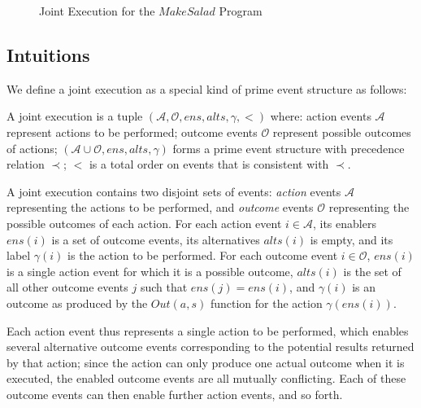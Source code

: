 %
\begin{figure}[!h]

\caption{Joint Execution for the $MakeSalad$ Program}


\label{fig:JE:MakeSalad1} 
\end{figure}



\subsection{Intuitions}

We define a joint execution as a special kind of prime event structure
as follows:

\begin{defnL}
 A joint execution is a tuple $(\mathcal{A},\mathcal{O},ens,alts,\gamma,<)$
where: action events $\mathcal{A}$ represent actions to be performed;
outcome events $\mathcal{O}$ represent possible outcomes of actions;
$(\mathcal{A}\cup\mathcal{O},ens,alts,\gamma)$ forms a prime event
structure with precedence relation $\prec$; $<$ is a total order
on events that is consistent with $\prec$. 
\end{defnL}
A joint execution contains two disjoint sets of events: \emph{action}
events $\mathcal{A}$ representing the actions to be performed, and
\emph{outcome} events $\mathcal{O}$ representing the possible outcomes
of each action. For each action event $i\in\mathcal{A}$, its enablers
$ens(i)$ is a set of outcome events, its alternatives $alts(i)$
is empty, and its label $\gamma(i)$ is the action to be performed.
For each outcome event $i\in\mathcal{O}$, $ens(i)$ is a single action
event for which it is a possible outcome, $alts(i)$ is the set of
all other outcome events $j$ such that $ens(j)=ens(i)$, and $\gamma(i)$
is an outcome as produced by the $Out({a},s)$ function for the action
$\gamma(ens(i))$.

Each action event thus represents a single action to be performed,
which enables several alternative outcome events corresponding to
the potential results returned by that action; since the action can
only produce one actual outcome when it is executed, the enabled outcome
events are all mutually conflicting. Each of these outcome events
can then enable further action events, and so forth.

